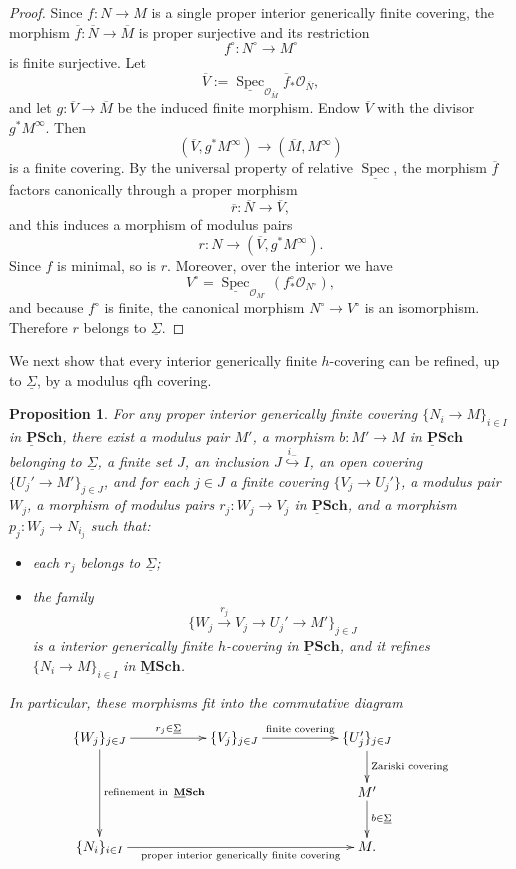 \documentclass[11pt]{amsart}
\newcommand{\sO}{\mathcal{O}}
\newcommand{\ul}[1]{{\underline{#1}}}
\newcommand{\Spec}{\operatorname{Spec}}
\newcommand{\ol}{\overline}
\newcommand{\ulPSCH}{\operatorname{\mathbf{\underline{P}Sch}}}
\newcommand{\ulMSCH}{\operatorname{\mathbf{\underline{M}Sch}}}
\def\Minf{M^{\infty}}
\newtheorem{prop}[lemma]{Proposition}
\theoremstyle{definition}
\theoremstyle{remark}
\numberwithin{equation}{section}
\begin{document}
\begin{proof}
Since $f:N \to M$ is a single proper interior generically finite covering, the morphism $\ol{f}:\ol{N}\to \ol{M}$ is proper surjective and its restriction
\[
f^\circ:N^\circ \to M^\circ
\]
is finite surjective. Let
\[
\ol{{V}} := \underline{\Spec}_{\sO_{\ol{M}}}\ol{f}_*\sO_{\ol{N}},
\]
and let $g:\ol{V}\to \ol{M}$ be the induced finite morphism. Endow $\ol{V}$ with the divisor $g^*\Minf$. Then
\[
(\ol{V},g^*\Minf) \to (\ol{M},\Minf)
\]
is a finite covering. By the universal property of relative $\underline{\Spec}$, the morphism $\ol{f}$ factors canonically through a proper morphism
\[
\ol{r}:\ol{N}\to \ol{V},
\]
and this induces a morphism of modulus pairs
\[
r:N \to (\ol{V},g^*\Minf).
\]
Since $f$ is minimal, so is $r$. Moreover, over the interior we have
\[
V^\circ=\underline{\Spec}_{\sO_{M^\circ}}(f^\circ_*\sO_{N^\circ}),
\]
and because $f^\circ$ is finite, the canonical morphism $N^\circ\to V^\circ$ is an isomorphism. Therefore $r$ belongs to $\ul{\Sigma}$.
\end{proof}

We next show that every interior generically finite $h$-covering can be refined, up to $\ul{\Sigma}$, by a modulus qfh covering.

\begin{prop}\label{hisqfh}
For any proper interior generically finite covering $\{N_i \to M\}_{i\in I}$ in $\ulPSCH$, there exist a modulus pair $M'$, a morphism $b:M' \to M$ in $\ulPSCH$ belonging to $\ul{\Sigma}$, a finite set $J$, an inclusion $J \overset{i_{-}}{\hookrightarrow} I$, an open covering $\{U_j' \to M'\}_{j\in J}$, and for each $j \in J$ a finite covering $\{V_j \to U_j'\}$, a modulus pair $W_j$, a morphism of modulus pairs $r_j: W_j \to V_j$ in $\ulPSCH$, and a morphism $p_j:W_j \to N_{i_j}$ such that:
\begin{itemize}
    \item[(1)] each $r_j$ belongs to $\ul{\Sigma}$;
    \item[(2)] the family
    \[
    \{W_j \overset{r_j}{\to} V_j \to U_j' \to M' \}_{j\in J}
    \]
    is a interior generically finite $h$-covering in $\ulPSCH$, and it refines $\{N_i \to M\}_{i\in I}$ in $\ulMSCH$.
\end{itemize}
In particular, these morphisms fit into the commutative diagram
\[
\xymatrix{
\{W_j\}_{j\in J}\ar[dd]^-{\text{refinement in }\ulMSCH} \ar[rr]^-{r_j \in \ul{\Sigma}}&& \{V_j\}_{j\in J}\ar[rr]^-{\text{finite covering}} && \{U_j'\}_{j\in J}\ar[d]^-{\text{Zariski covering}} \\
&&&&M' \ar[d]^-{b\in \ul{\Sigma}}\\
\{N_i\}_{i\in I}\ar[rrrr]_-{\text{proper interior generically finite covering}}&& &&M.
}
\]
\end{prop}
\end{document}

